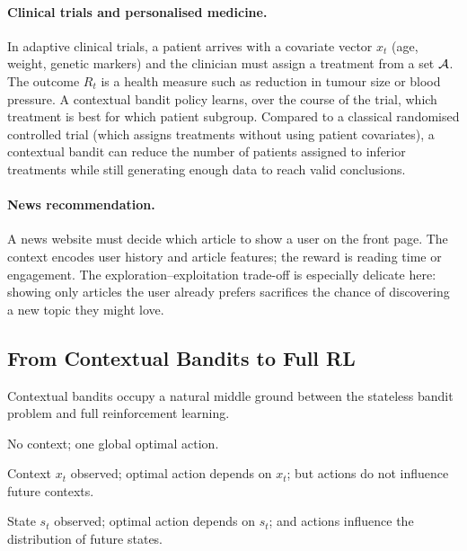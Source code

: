 \paragraph{Clinical trials and personalised medicine.}
In adaptive clinical trials, a patient arrives with a covariate vector $x_t$ (age, weight, genetic markers) and the clinician must assign a treatment from a set $\mathcal{A}$.  The outcome $R_t$ is a health measure such as reduction in tumour size or blood pressure.  A contextual bandit policy learns, over the course of the trial, which treatment is best for which patient subgroup.  Compared to a classical randomised controlled trial (which assigns treatments without using patient covariates), a contextual bandit can reduce the number of patients assigned to inferior treatments while still generating enough data to reach valid conclusions.

\paragraph{News recommendation.}
A news website must decide which article to show a user on the front page.  The context encodes user history and article features; the reward is reading time or engagement.  The exploration--exploitation trade-off is especially delicate here: showing only articles the user already prefers sacrifices the chance of discovering a new topic they might love.

\subsection*{From Contextual Bandits to Full RL}

Contextual bandits occupy a natural middle ground between the stateless bandit problem and full reinforcement learning.

\begin{description}[leftmargin=!, labelwidth=4cm]
\item[Stateless bandits] No context; one global optimal action.
\item[Contextual bandits] Context $x_t$ observed; optimal action depends on $x_t$; but actions do not influence future contexts.
\item[Full RL (MDP)] State $s_t$ observed; optimal action depends on $s_t$; and actions influence the distribution of future states.
\end{description}

